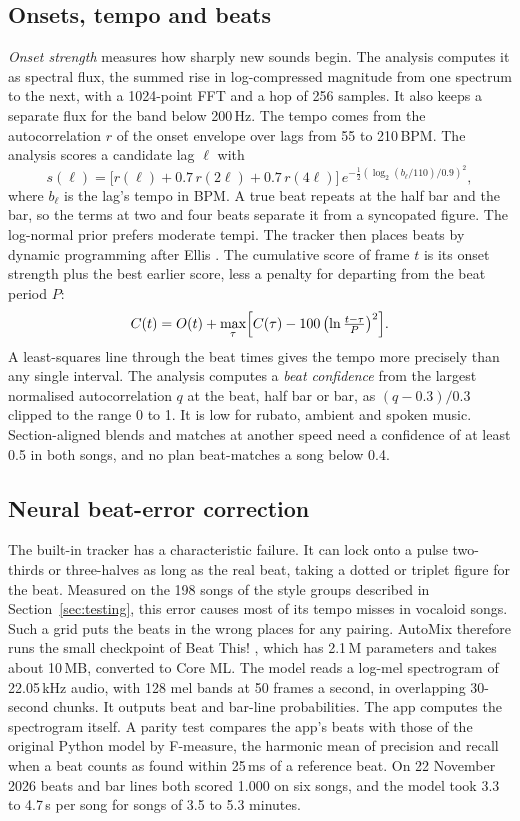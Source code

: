 \documentclass[conference,a4paper]{IEEEtran}
\begin{document}
\subsection{Onsets, tempo and beats}
\emph{Onset strength} measures how sharply new sounds begin. The analysis computes it as spectral
flux, the summed rise in log-compressed magnitude from one spectrum to the next, with a 1024-point
FFT and a hop of 256 samples. It also keeps a separate flux for the band below 200\,Hz. The tempo
comes from the autocorrelation $r$ of the onset envelope over lags from 55 to 210\,BPM. The
analysis scores a candidate lag $\ell$ with
\begin{equation}
s(\ell)=\bigl[r(\ell)+0.7\,r(2\ell)+0.7\,r(4\ell)\bigr]\,
e^{-\frac{1}{2}\left(\log_2(b_\ell/110)/0.9\right)^2},
\end{equation}
where $b_\ell$ is the lag's tempo in BPM. A true beat repeats at the half bar and the bar, so the
terms at two and four beats separate it from a syncopated figure. The log-normal prior prefers
moderate tempi. The tracker then places beats by dynamic programming after Ellis
\cite{ellis2007}. The cumulative score of frame $t$ is its onset strength plus the best earlier
score, less a penalty for departing from the beat period $P$:
\begin{equation}
C(t)=O(t)+\max_{\tau}\Bigl[C(\tau)-100\,\bigl(\ln\tfrac{t-\tau}{P}\bigr)^2\Bigr].
\end{equation}
A least-squares line through the beat times gives the tempo more precisely than any single
interval. The analysis computes a \emph{beat confidence} from the largest normalised
autocorrelation $q$ at the beat, half bar or bar, as $(q-0.3)/0.3$ clipped to the range 0 to 1. It
is low for rubato, ambient and spoken music. Section-aligned blends and matches at another speed
need a confidence of at least 0.5 in both songs, and no plan beat-matches a song below 0.4.

\subsection{Neural beat-error correction}
The built-in tracker has a characteristic failure. It can lock onto a pulse two-thirds or
three-halves as long as the real beat, taking a dotted or triplet figure for the beat. Measured on
the 198 songs of the style groups described in Section~\ref{sec:testing}, this error causes most
of its tempo misses in vocaloid songs. Such a grid puts the beats in the wrong places for any
pairing. AutoMix therefore runs the small checkpoint of Beat This! \cite{beatthis}, which has
2.1\,M parameters and takes about 10\,MB, converted to Core ML. The model reads a log-mel
spectrogram of 22.05\,kHz audio, with 128 mel bands at 50 frames a second, in overlapping 30-second
chunks. It outputs beat and bar-line probabilities. The app computes the spectrogram itself. A
parity test compares the app's beats with those of the original Python model by F-measure, the
harmonic mean of precision and recall when a beat counts as found within 25\,ms of a reference
beat. On 22 November 2026 beats and bar lines both scored 1.000 on six songs, and the model took
3.3 to 4.7\,s per song for songs of 3.5 to 5.3 minutes.
\end{document}
